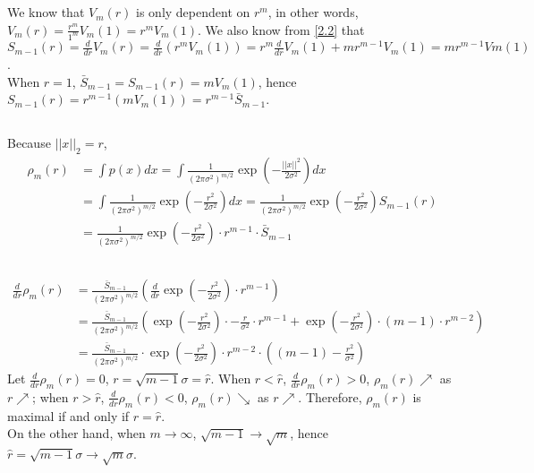\documentclass{article}
\begin{document}
        \subsection{}
        We know that $V_m(r)$ is only dependent on $r^{m}$, in other words, $V_m(r)=\frac{r^m}{1^m}V_m(1)=r^mV_m(1)$.
        We also know from \ref{2.2} that $S_{m-1}(r)=\frac{d}{dr}V_m(r)=\frac{d}{dr}(r^mV_m(1))=r^m\frac{d}{dr}V_m(1)+mr^{m-1}V_m(1)
        =mr^{m-1}Vm(1)$.\\
        When $r=1$, $\bar{S}_{m-1}=S_{m-1}(r)=mV_{m}(1)$, hence $S_{m-1}(r)=r^{m-1}\left(mV_m(1)\right)=r^{m-1}\bar{S}_{m-1}$.

        \subsection{}
        Because $||x||_2=r$, 
        \begin{align*}
            \rho_m(r)&=\int p(x)dx=\int \frac{1}{(2\pi\sigma^2)^{m/2}}\exp(-\frac{||x||^2}{2\sigma^2})dx\\
            &=\int \frac{1}{(2\pi\sigma^2)^{m/2}}\exp(-\frac{r^2}{2\sigma^2})dx=\frac{1}{(2\pi\sigma^2)^{m/2}}\exp(-\frac{r^2}{2\sigma^2})S_{m-1}(r)\\
            &=\frac{1}{(2\pi\sigma^2)^{m/2}}\exp(-\frac{r^2}{2\sigma^2})\cdot r^{m-1}\cdot\bar{S}_{m-1}
        \end{align*}

        \subsection{}\label{2.5}
        \begin{align*}
            \frac{d}{dr}\rho_m(r)&=\frac{\bar{S}_{m-1}}{(2\pi\sigma^2)^{m/2}}\left(\frac{d}{dr}\exp(-\frac{r^2}{2\sigma^2})\cdot r^{m-1}\right)\\
            &=\frac{\bar{S}_{m-1}}{(2\pi\sigma^2)^{m/2}}\left(\exp(-\frac{r^2}{2\sigma^2})\cdot -\frac{r}{\sigma^2}\cdot r^{m-1}+\exp(-\frac{r^2}{2\sigma^2})\cdot(m-1)\cdot r^{m-2}\right)\\
            &=\frac{\bar{S}_{m-1}}{(2\pi\sigma^2)^{m/2}}\cdot \exp(-\frac{r^2}{2\sigma^2})\cdot r^{m-2}\cdot\left((m-1)-\frac{r^2}{\sigma^2}\right)
        \end{align*}
        Let $\frac{d}{dr}\rho_m(r)=0$, $r=\sqrt{m-1}\sigma=\hat{r}$. When $r<\hat{r}$, $\frac{d}{dr}\rho_m(r)>0$, $\rho_m(r)\nearrow$ as $r\nearrow$;
        when $r>\hat{r}$, $\frac{d}{dr}\rho_m(r)<0$, $\rho_m(r)\searrow$ as $r\nearrow$. Therefore, $\rho_m(r)$ is maximal if and only if $r=\hat{r}$.\\
        On the other hand, when $m\to\infty$, $\sqrt{m-1}\to\sqrt{m}$, hence $\hat{r}=\sqrt{m-1}\sigma\to\sqrt{m}\sigma$.
\end{document}
